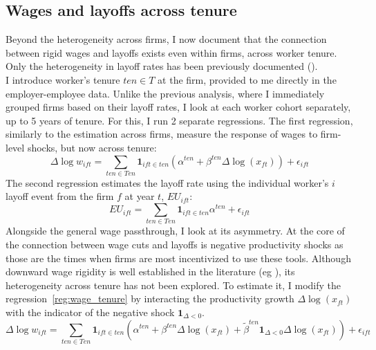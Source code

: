 \subsection*{Wages and layoffs across tenure} %
Beyond the heterogeneity across firms, I now document that the connection between rigid wages and layoffs exists even within firms, across worker tenure. Only the heterogeneity in layoff rates has been previously documented (\textcite{buhai2014}). \\
I introduce worker's tenure $ten \in T$ at the firm, provided to me directly in the employer-employee data. Unlike the previous analysis, where I immediately grouped firms based on their layoff rates, I look at each worker cohort separately, up to 5 years of tenure. For this, I run 2 separate regressions. The first regression, similarly to the estimation across firms, measure the response of wages to firm-level shocks, but now across tenure:
\begin{equation} \label{reg:wage_tenure}
\Delta \log w_{ift} = \sum_{ten \in Ten} \mathbf{1}_{ift \in ten}(\alpha^{ten} + \beta^{ten}\Delta \log(x_{ft})) + \epsilon_{ift} 
\end{equation}  
The second regression estimates the layoff rate using the individual worker's $i$ layoff event from the firm $f$ at year $t$, $EU_{ift}:$
\[ EU_{ift} = \sum_{ten \in Ten} \mathbf{1}_{ift \in ten}\alpha^{ten}  + \epsilon_{ift}\] 
Alongside the general wage passthrough, I look at its asymmetry. At the core of the connection between wage cuts and layoffs is negative productivity shocks as those are the times when firms are most incentivized to use these tools. Although downward wage rigidity is well established in the literature (eg \textcite{hazell2021}), its heterogeneity across tenure has not been explored. To estimate it, I modify the regression~\ref{reg:wage_tenure} by interacting the productivity growth $\Delta \log(x_{ft})$ with the indicator of the negative shock $\mathbf{1}_{\Delta < 0}$.
\[ \Delta \log w_{ift} = \sum_{ten \in Ten} \mathbf{1}_{ift \in ten}(\alpha^{ten} + \beta^{ten}\Delta \log(x_{ft}) + \tilde{\beta}^{ten} \mathbf{1}_{\Delta < 0}\Delta \log(x_{ft})) + \epsilon_{ift} \] 

